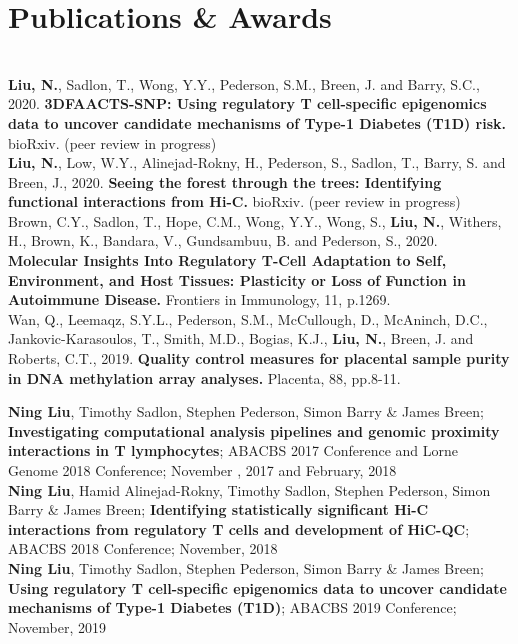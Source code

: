 \documentclass[]{deedy-resume-openfont}
\begin{document}
\section{Publications \& Awards}
\\
\textbf{Liu, N.}, Sadlon, T., Wong, Y.Y., Pederson, S.M., Breen, J. and Barry, S.C., 2020. \textbf{3DFAACTS-SNP: Using regulatory T cell-specific epigenomics data to uncover candidate mechanisms of Type-1 Diabetes (T1D) risk.} bioRxiv. (peer review in progress)\\ 
\textbf{Liu, N.}, Low, W.Y., Alinejad-Rokny, H., Pederson, S., Sadlon, T., Barry, S. and Breen, J., 2020. \textbf{Seeing the forest through the trees: Identifying functional interactions from Hi-C.} bioRxiv. (peer review in progress)\\
Brown, C.Y., Sadlon, T., Hope, C.M., Wong, Y.Y., Wong, S., \textbf{Liu, N.}, Withers, H., Brown, K., Bandara, V., Gundsambuu, B. and Pederson, S., 2020. \textbf{Molecular Insights Into Regulatory T-Cell Adaptation to Self, Environment, and Host Tissues: Plasticity or Loss of Function in Autoimmune Disease. }Frontiers in Immunology, 11, p.1269.\\
Wan, Q., Leemaqz, S.Y.L., Pederson, S.M., McCullough, D., McAninch, D.C., Jankovic-Karasoulos, T., Smith, M.D., Bogias, K.J., \textbf{Liu, N.}, Breen, J. and Roberts, C.T., 2019. \textbf{Quality control measures for placental sample purity in DNA methylation array analyses.} Placenta, 88, pp.8-11.\\

\sectionsep

\textbf{Ning Liu}, Timothy Sadlon, Stephen Pederson, Simon Barry \& James Breen; \textbf{Investigating computational analysis pipelines and genomic proximity interactions in T lymphocytes}; ABACBS 2017 Conference and Lorne Genome 2018 Conference; November , 2017 and February, 2018\\ 
\textbf{Ning Liu}, ‪Hamid Alinejad-Rokny, Timothy Sadlon, Stephen Pederson, Simon Barry \& James Breen; \textbf{Identifying statistically significant Hi-C interactions from regulatory T cells and development of HiC-QC}; ABACBS 2018 Conference; November, 2018\\ 
\textbf{Ning Liu}, Timothy Sadlon, Stephen Pederson, Simon Barry \& James Breen; \textbf{Using regulatory T cell-specific epigenomics data to uncover candidate mechanisms of Type-1 Diabetes (T1D)}; ABACBS 2019 Conference; November, 2019\\ 
\sectionsep
\end{document}
